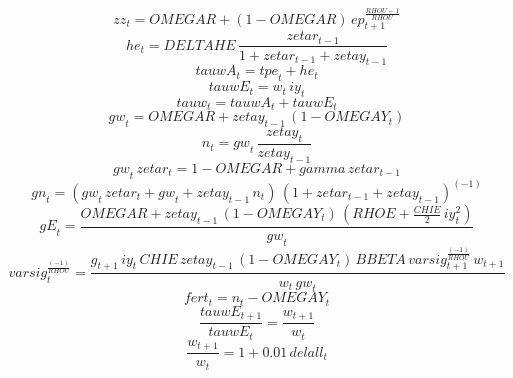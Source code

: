 \begin{dmath}
{zz}_{t}={OMEGAR}+\left(1-{OMEGAR}\right)\, {ep}_{t+1}^{\frac{{RHOU}-1}{{RHOU}}}
\end{dmath}
\begin{dmath}
{he}_{t}={DELTAHE}\, \frac{{zetar}_{t-1}}{1+{zetar}_{t-1}+{zetay}_{t-1}}
\end{dmath}
\begin{dmath}
{tauwA}_{t}={tpe}_{t}+{he}_{t}
\end{dmath}
\begin{dmath}
{tauwE}_{t}={w}_{t}\, {iy}_{t}
\end{dmath}
\begin{dmath}
{tauw}_{t}={tauwA}_{t}+{tauwE}_{t}
\end{dmath}
\begin{dmath}
{gw}_{t}={OMEGAR}+{zetay}_{t-1}\, \left(1-{OMEGAY}_{t}\right)
\end{dmath}
\begin{dmath}
{n}_{t}={gw}_{t}\, \frac{{zetay}_{t}}{{zetay}_{t-1}}
\end{dmath}
\begin{dmath}
{gw}_{t}\, {zetar}_{t}=1-{OMEGAR}+{gamma}\, {zetar}_{t-1}
\end{dmath}
\begin{dmath}
{gn}_{t}=\left({gw}_{t}\, {zetar}_{t}+{gw}_{t}+{zetay}_{t-1}\, {n}_{t}\right)\, \left(1+{zetar}_{t-1}+{zetay}_{t-1}\right)^{\left(-1\right)}
\end{dmath}
\begin{dmath}
{gE}_{t}=\frac{{OMEGAR}+{zetay}_{t-1}\, \left(1-{OMEGAY}_{t}\right)\, \left({RHOE}+\frac{{CHIE}}{2}\, {iy}_{t}^{2}\right)}{{gw}_{t}}
\end{dmath}
\begin{dmath}
{varsig}_{t}^{\frac{\left(-1\right)}{{RHOU}}}=\frac{{g}_{t+1}\, {iy}_{t}\, {CHIE}\, {zetay}_{t-1}\, \left(1-{OMEGAY}_{t}\right)\, {BBETA}\, {varsig}_{t+1}^{\frac{\left(-1\right)}{{RHOU}}}\, {w}_{t+1}}{{w}_{t}\, {gw}_{t}}
\end{dmath}
\begin{dmath}
{fert}_{t}={n}_{t}-{OMEGAY}_{t}
\end{dmath}
\begin{dmath}
\frac{{tauwE}_{t+1}}{{tauwE}_{t}}=\frac{{w}_{t+1}}{{w}_{t}}
\end{dmath}
\begin{dmath}
\frac{{w}_{t+1}}{{w}_{t}}=1+0.01\, {delall}_{t}
\end{dmath}
